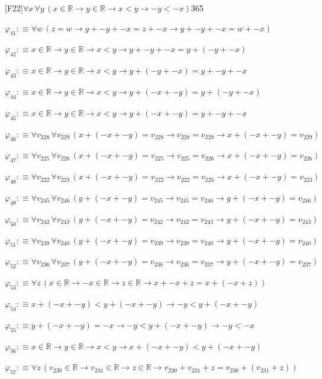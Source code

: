 \begin{fullproof}{[F22]}{$\forall x\,\forall y\,(x \in \mathbb{R} \to y \in \mathbb{R} \to x < y \to -y < -x)$}{365}
\begin{abbrevlist}
\item $\varphi_{41} :\equiv \forall w\,(z = w \to y + -y + -x = z + -x \to y + -y + -x = w + -x)$
\item $\varphi_{42} :\equiv x \in \mathbb{R} \to y \in \mathbb{R} \to x < y \to y + -y + -x = y + (-y + -x)$
\item $\varphi_{43} :\equiv x \in \mathbb{R} \to y \in \mathbb{R} \to x < y \to y + (-y + -x) = y + -y + -x$
\item $\varphi_{44} :\equiv x \in \mathbb{R} \to y \in \mathbb{R} \to x < y \to y + (-x + -y) = y + (-y + -x)$
\item $\varphi_{45} :\equiv x \in \mathbb{R} \to y \in \mathbb{R} \to x < y \to y + (-x + -y) = y + -y + -x$
\item $\varphi_{46} :\equiv \forall v_{228}\,\forall v_{229}\,(x + (-x + -y) = v_{228} \to v_{228} = v_{229} \to x + (-x + -y) = v_{229})$
\item $\varphi_{47} :\equiv \forall v_{225}\,\forall v_{226}\,(x + (-x + -y) = v_{225} \to v_{225} = v_{226} \to x + (-x + -y) = v_{226})$
\item $\varphi_{48} :\equiv \forall v_{222}\,\forall v_{223}\,(x + (-x + -y) = v_{222} \to v_{222} = v_{223} \to x + (-x + -y) = v_{223})$
\item $\varphi_{49} :\equiv \forall v_{245}\,\forall v_{246}\,(y + (-x + -y) = v_{245} \to v_{245} = v_{246} \to y + (-x + -y) = v_{246})$
\item $\varphi_{50} :\equiv \forall v_{242}\,\forall v_{243}\,(y + (-x + -y) = v_{242} \to v_{242} = v_{243} \to y + (-x + -y) = v_{243})$
\item $\varphi_{51} :\equiv \forall v_{239}\,\forall v_{240}\,(y + (-x + -y) = v_{239} \to v_{239} = v_{240} \to y + (-x + -y) = v_{240})$
\item $\varphi_{52} :\equiv \forall v_{236}\,\forall v_{237}\,(y + (-x + -y) = v_{236} \to v_{236} = v_{237} \to y + (-x + -y) = v_{237})$
\item $\varphi_{53} :\equiv \forall z\,(x \in \mathbb{R} \to -x \in \mathbb{R} \to z \in \mathbb{R} \to x + -x + z = x + (-x + z))$
\item $\varphi_{54} :\equiv x + (-x + -y) < y + (-x + -y) \to -y < y + (-x + -y)$
\item $\varphi_{55} :\equiv y + (-x + -y) = -x \to -y < y + (-x + -y) \to -y < -x$
\item $\varphi_{56} :\equiv x \in \mathbb{R} \to y \in \mathbb{R} \to x < y \to x + (-x + -y) < y + (-x + -y)$
\item $\varphi_{57} :\equiv \forall z\,(v_{230} \in \mathbb{R} \to v_{231} \in \mathbb{R} \to z \in \mathbb{R} \to v_{230} + v_{231} + z = v_{230} + (v_{231} + z))$

\end{abbrevlist}
\end{fullproof}
